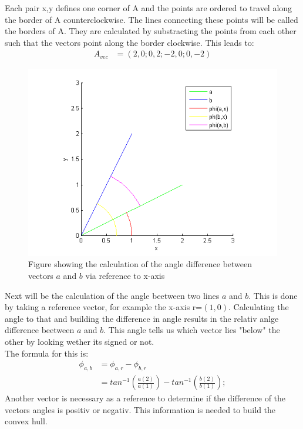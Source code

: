 Each pair x,y defines one corner of A and the points are ordered to travel along the border of A counterclockwise.
The lines connecting these points will be called the borders of A. They are calculated by substracting the points from each other such that the vectors point along the border clockwise. This leads to:
\begin{align*}
A_{vec} &= 	( 2 , 0 ; 0 ,2 ;-2, 0; 0, -2)	
\end{align*}

\begin{figure}[H]
\includegraphics{VectorDegree}
\caption{Figure showing the calculation of the angle difference between vectors $a$ and $b$ via reference to x-axis}
 \end{figure}

Next will be the calculation of the angle beetween two lines $a$ and $b$. This is done by taking a reference vector, for example the x-axis r=$(1,0)$. Calculating the angle to that and building the difference in angle results in the relativ anlge difference beetween $a$ and $b$. This angle tells us which vector lies "below" the other by looking wether its signed or not.\\
The formula for this is:
\begin{align*}
  \phi_{a,b} &= \phi_{a,r} - \phi_{b,r}\\
	&= tan^{-1} ( \frac{ a(2) }{  a(1) } ) - tan^{-1} ( \frac{b(2)}{b(1)}); 
\end{align*}
Another vector is necessary as a reference to determine if the difference of the vectors angles is positiv or negativ. This information is needed to build the convex hull.


